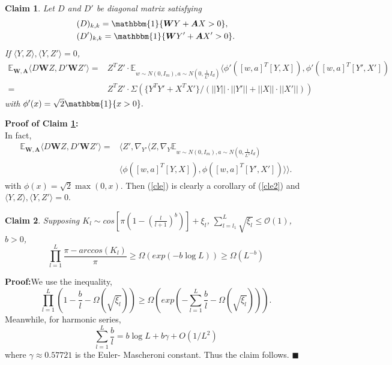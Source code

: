 \documentclass{article}
\newcommand{\cO}{\mathcal{O}}
\newtheorem{cla}{\textbf{Claim}}[section]
\newcommand*{\QEDA}{\hfill\ensuremath{\blacksquare}}%
\begin{document}
\begin{cla}\label{c51}
Let $D$ and $D'$ be diagonal matrix satisfying
\begin{equation}
\begin{aligned}
&(D)_{k,k}=\mathbbm{1}\{\bm{W}Y+\bm{A}X>0\},\\
&(D')_{k,k}=\mathbbm{1}\{\bm{W}Y'+\bm{A}X'>0\}.
\end{aligned}
\end{equation}
If $\langle Y, Z\rangle, \langle Y, Z'\rangle =0$,
\begin{equation}\label{cle}
\begin{aligned}
\mathbb{E}_{\bm{W},\bm{A}} \langle D\bm{W}Z, D'\bm{W}Z' \rangle = &Z^TZ'\cdot \mathbb{E}_{w\sim N(0,I_m),a\sim N(0,\frac{1}{L^3}I_d)}  \langle \phi'([w,a]^T[Y,X]), \phi'([w,a]^T[Y',X'])\\
=&Z^T Z'\cdot\Sigma(\{Y^TY'+X^TX'\}/(||Y||\cdot ||Y'||+||X||\cdot ||X'||))
\end{aligned}
\end{equation}
with $\phi'(x)=\sqrt{2}\mathbbm{1}\{x>0\}.$
\end{cla}
{\bf Proof of Claim \ref{c51}:}\\
In fact,
\begin{equation}\label{cle2}
\begin{aligned}
\mathbb{E}_{\bm{W},\bm{A}} \langle D\bm{W}Z, D'\bm{W}Z' \rangle= &\langle Z',\nabla_{Y'}\langle Z, \nabla_{Y} \mathbb{E}_{w\sim N(0,I_m),a\sim N(0,\frac{1}{L^3}I_d)} \\
 &\langle \phi([w,a]^T[Y,X]), \phi([w,a]^T[Y',X']) \rangle \rangle .
\end{aligned}
\end{equation}
with $\phi(x)=\sqrt{2}\max(0,x)$. Then (\ref{cle}) is clearly a corollary of (\ref{cle2}) and $\langle Y, Z\rangle, \langle Y, Z'\rangle =0$.

\begin{cla}\label{cl1}
Supposing $K_l\sim cos[\pi(1-(\frac{l}{l+1})^{b})]+\xi_l$, $\sum_{l=l_1}^L\sqrt{\xi_l}\leq \cO(1)$, $b>0$,
\begin{equation}
\prod_{l=1}^{L}\frac{\pi-arccos(K_l)}{\pi}\geq \Omega( exp(-b\log L ))\geq \Omega (L^{-b})
\end{equation}
\end{cla}
{\bf Proof:}We use the inequality,
\begin{equation}
\prod_{l=1}^{L}(1-\frac{b}{l}-\Omega(\sqrt{\xi_l}))\geq \Omega(exp(-\sum_{l=1}^L\frac{b}{l}-\Omega(\sqrt{\xi_l}))).
\end{equation}
Meanwhile, for harmonic series,
\begin{equation}
\sum_{l=1}^L\frac{b}{l}=b\log L+b\gamma+O(1/L^2)
\end{equation}
where $\gamma \approx 0.57721 $ is the Euler- Mascheroni constant. Thus the claim follows.
\QEDA
\end{document}
